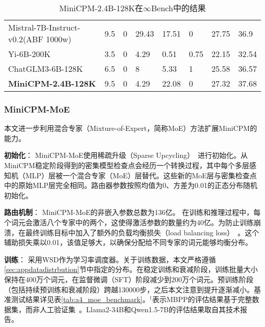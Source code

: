 \begin{table}[htpb]
{\begin{tabular}{m{4cm}m{1.4cm}m{1.0cm}m{1.0cm}m{1.2cm}m{1.2cm}m{1.2cm}m{1.2cm}}
    Mistral-7B-Instruct-v0.2(ABF 1000w) & 9.5                   & 0          & 29.43      & 17.51       & 0         & 27.75 & 36.9               \\
    Yi-6B-200K                          & 3.5                   & 0          & 4.29       & 0.51        & 0.75      & 22.15 & 32.54              \\
    ChatGLM3-6B-128K                    & 6.5                   & 0          & 8          & 5.33        & 1         & 25.58 & 36.57              \\
    \midrule
    \textbf{MiniCPM-2.4B-128K}                   & 9.5                   & 0          & 4.29       & 22.08       & 0         & 27.32 & 37.68              \\
    \bottomrule
    \end{tabular}
    }
    \caption{MiniCPM-2.4B-128K在$\infty$Bench中的结果}
    \label{tab:longcontext}
    \end{table}

\subsubsection{MiniCPM-MoE}
本文进一步利用混合专家（Mixture-of-Expert，简称MoE）方法扩展MiniCPM的能力。

\textbf{初始化}：
MiniCPM-MoE使用稀疏升级（Sparse Upcycling）~\citep{komatsuzaki2022sparse}进行初始化。从MiniCPM稳定阶段得到的密集模型检查点会经历一个转换过程，其中每个多层感知机（MLP）层被一个混合专家（MoE）层替代。这些新的MoE层与密集检查点中的原始MLP层完全相同。路由器参数按照均值为0、方差为0.01的正态分布随机初始化。

\textbf{路由机制}：
MiniCPM-MoE的非嵌入参数总数为136亿。
在训练和推理过程中，每个词元会激活八个专家中的两个，这使得激活参数的数量约为40亿。为防止训练崩溃，在最终训练目标中加入了额外的负载均衡损失（load balancing loss）~\citep{fedus2022switch}。这个辅助损失乘以0.01，该值足够大，以确保分配给不同专家的词元能够均衡分布。

\textbf{训练}：
采用WSD作为学习率调度器。关于训练数据，本文严格遵循\ref{sec:appdatadistrbution}节中指定的分布。在稳定训练和衰减阶段，训练批量大小保持在400万个词元，在监督微调（SFT）阶段减少到200万个词元。预训练阶段（包括持续预训练和衰减阶段）跨越130000步，之后本文注意到提升逐渐减小。基准测试结果详见表\ref{tab:a4_moe_benchmark}。$^\dag$表示MBPP的评估结果基于完整数据集，而非人工验证集~\citep{austin2021program}。Llama2-34B和Qwen1.5-7B的评估结果取自其技术报告。

